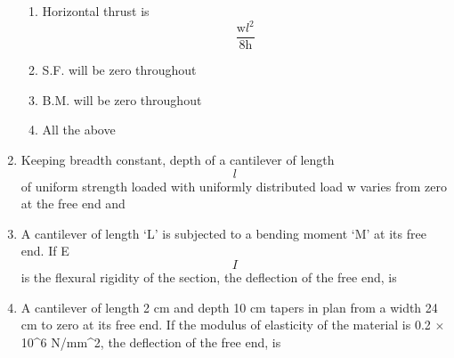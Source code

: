 \documentclass[11pt,a4paper]{article}
\begin{document}
\begin{enumerate}
\begin{enumerate}[label=\Alph*.]
\item{Horizontal thrust is $$\frac{{{\text{w}}{l^2}}}{{8{\text{h}}}}$$}
\item{S.F. will be zero throughout}
\item{B.M. will be zero throughout}
\item{All the above}
\end{enumerate}
\item{Keeping breadth constant, depth of a cantilever of length $$l$$ of uniform strength loaded with uniformly distributed load w varies from zero at the free end and}
\\
\item{A cantilever of length `L' is subjected to a bending moment `M' at its free end. If E$$I$$ is the flexural rigidity of the section, the deflection of the free end, is
}
\\
\item{A cantilever of length 2 cm and depth 10 cm tapers in plan from a width 24 cm to zero at its free end. If the modulus of elasticity of the material is 0.2 $\times$ 10\^{}6 N/mm\^{}2, the deflection of the free end, is
}
\\\begin{enumerate*}[itemjoin=\qquad, label=\Alph*.]
\item{2 mm}

\end{enumerate*}
\end{enumerate}
\end{document}
